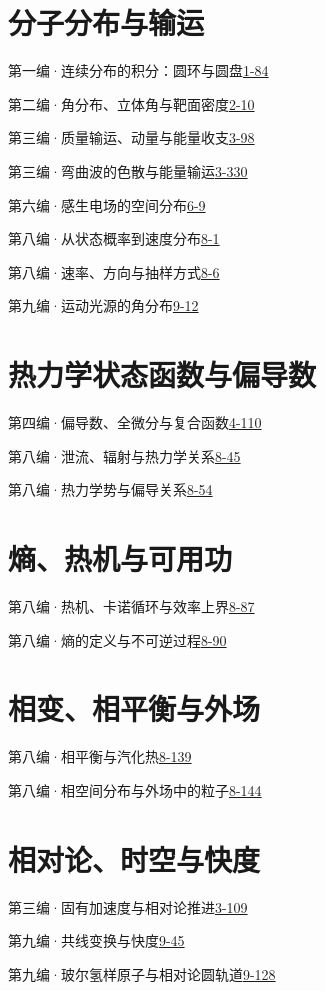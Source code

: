 \section*{分子分布与输运}
\noindent 第一编·连续分布的积分：圆环与圆盘\quad\href{course-page:1:89}{1-84}\par
\noindent 第二编·角分布、立体角与靶面密度\quad\href{course-page:2:12}{2-10}\par
\noindent 第三编·质量输运、动量与能量收支\quad\href{course-page:3:101}{3-98}\par
\noindent 第三编·弯曲波的色散与能量输运\quad\href{course-page:3:333}{3-330}\par
\noindent 第六编·感生电场的空间分布\quad\href{course-page:6:12}{6-9}\par
\noindent 第八编·从状态概率到速度分布\quad\href{course-page:8:4}{8-1}\par
\noindent 第八编·速率、方向与抽样方式\quad\href{course-page:8:9}{8-6}\par
\noindent 第九编·运动光源的角分布\quad\href{course-page:9:16}{9-12}\par
\section*{热力学状态函数与偏导数}
\noindent 第四编·偏导数、全微分与复合函数\quad\href{course-page:4:112}{4-110}\par
\noindent 第八编·泄流、辐射与热力学关系\quad\href{course-page:8:48}{8-45}\par
\noindent 第八编·热力学势与偏导关系\quad\href{course-page:8:57}{8-54}\par
\section*{熵、热机与可用功}
\noindent 第八编·热机、卡诺循环与效率上界\quad\href{course-page:8:90}{8-87}\par
\noindent 第八编·熵的定义与不可逆过程\quad\href{course-page:8:93}{8-90}\par
\section*{相变、相平衡与外场}
\noindent 第八编·相平衡与汽化热\quad\href{course-page:8:142}{8-139}\par
\noindent 第八编·相空间分布与外场中的粒子\quad\href{course-page:8:147}{8-144}\par
\section*{相对论、时空与快度}
\noindent 第三编·固有加速度与相对论推进\quad\href{course-page:3:112}{3-109}\par
\noindent 第九编·共线变换与快度\quad\href{course-page:9:49}{9-45}\par
\noindent 第九编·玻尔氢样原子与相对论圆轨道\quad\href{course-page:9:132}{9-128}\par
